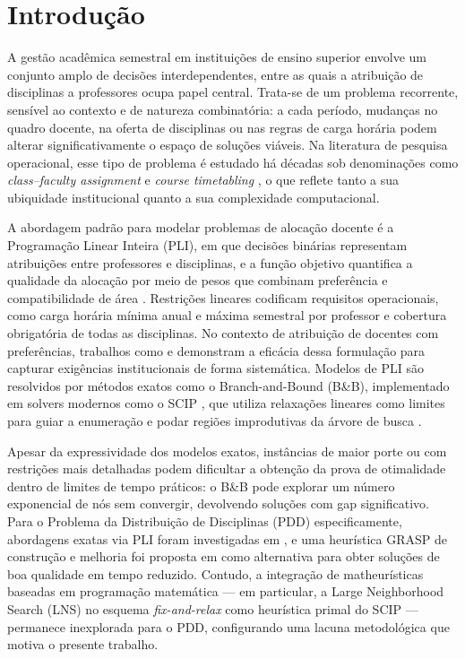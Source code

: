\chapter{Introdução}

A gestão acadêmica semestral em instituições de ensino superior envolve um conjunto amplo de decisões interdependentes, entre as quais a atribuição de disciplinas a professores ocupa papel central. Trata-se de um problema recorrente, sensível ao contexto e de natureza combinatória: a cada período, mudanças no quadro docente, na oferta de disciplinas ou nas regras de carga horária podem alterar significativamente o espaço de soluções viáveis. Na literatura de pesquisa operacional, esse tipo de problema é estudado há décadas sob denominações como \textit{class--faculty assignment} e \textit{course timetabling} \cite{carter_laporte_1998,gunawan_ng_ong_2008}, o que reflete tanto a sua ubiquidade institucional quanto a sua complexidade computacional.

A abordagem padrão para modelar problemas de alocação docente é a Programação Linear Inteira (PLI), em que decisões binárias representam atribuições entre professores e disciplinas, e a função objetivo quantifica a qualidade da alocação por meio de pesos que combinam preferência e compatibilidade de área \cite{wolsey_2020}. Restrições lineares codificam requisitos operacionais, como carga horária mínima anual e máxima semestral por professor e cobertura obrigatória de todas as disciplinas. No contexto de atribuição de docentes com preferências, trabalhos como  e  demonstram a eficácia dessa formulação para capturar exigências institucionais de forma sistemática. Modelos de PLI são resolvidos por métodos exatos como o Branch-and-Bound (B\&B), implementado em solvers modernos como o SCIP \cite{gamrath_2020_scip}, que utiliza relaxações lineares como limites para guiar a enumeração e podar regiões improdutivas da árvore de busca \cite{vanderbei_2014}.

Apesar da expressividade dos modelos exatos, instâncias de maior porte ou com restrições mais detalhadas podem dificultar a obtenção da prova de otimalidade dentro de limites de tempo práticos: o B\&B pode explorar um número exponencial de nós sem convergir, devolvendo soluções com gap significativo. Para o Problema da Distribuição de Disciplinas (PDD) especificamente, abordagens exatas via PLI foram investigadas em , e uma heurística GRASP de construção e melhoria foi proposta em  como alternativa para obter soluções de boa qualidade em tempo reduzido. Contudo, a integração de matheurísticas baseadas em programação matemática --- em particular, a Large Neighborhood Search (LNS) no esquema \textit{fix-and-relax} como heurística primal do SCIP --- permanece inexplorada para o PDD, configurando uma lacuna metodológica que motiva o presente trabalho.

